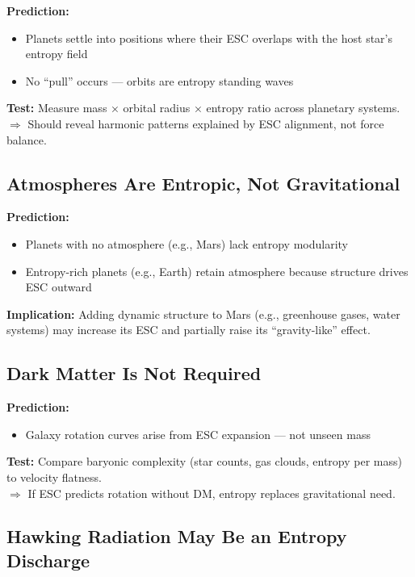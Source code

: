 \documentclass[12pt]{article}
\begin{document}
\textbf{Prediction:}
\begin{itemize}
    \item Planets settle into positions where their ESC overlaps with the host star’s entropy field
    \item No ``pull'' occurs — orbits are entropy standing waves
\end{itemize}

\textbf{Test:} Measure mass × orbital radius × entropy ratio across planetary systems.\\
$\Rightarrow$ Should reveal harmonic patterns explained by ESC alignment, not force balance.

\subsection{Atmospheres Are Entropic, Not Gravitational}

\textbf{Prediction:}
\begin{itemize}
    \item Planets with no atmosphere (e.g., Mars) lack entropy modularity
    \item Entropy-rich planets (e.g., Earth) retain atmosphere because structure drives ESC outward
\end{itemize}

\textbf{Implication:} Adding dynamic structure to Mars (e.g., greenhouse gases, water systems) may increase its ESC and partially raise its ``gravity-like'' effect.

\subsection{Dark Matter Is Not Required}

\textbf{Prediction:}
\begin{itemize}
    \item Galaxy rotation curves arise from ESC expansion — not unseen mass
\end{itemize}

\textbf{Test:} Compare baryonic complexity (star counts, gas clouds, entropy per mass) to velocity flatness.\\
$\Rightarrow$ If ESC predicts rotation without DM, entropy replaces gravitational need.

\subsection{Hawking Radiation May Be an Entropy Discharge}
\end{document}
